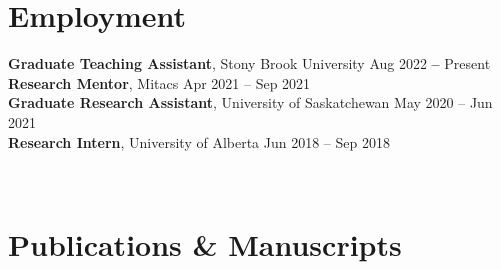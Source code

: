 \documentclass[letterpaper,11pt]{article}
\newcommand{\resumeSubHeadingListStart}{\begin{itemize}[leftmargin=0.15in, label={}]}
\newcommand{\resumeSubHeadingListEnd}{\end{itemize}}
\begin{document}
\section{Employment}
  \resumeSubHeadingListStart
    \small{\item{
        \textbf{Graduate Teaching Assistant}, Stony Brook University \hfill Aug 2022 \textbf{--} Present \\ \vspace{1pt}
        \textbf{Research Mentor}, Mitacs \hfill Apr 2021 – Sep 2021 \\ \vspace{1pt}
        \textbf{Graduate Research Assistant}, University of Saskatchewan \hfill May 2020 – Jun 2021 \\ \vspace{1pt}
        \textbf{Research Intern}, University of Alberta \hfill Jun 2018 – Sep 2018}} \\ \vspace{-5pt}
  \resumeSubHeadingListEnd



\section{Publications \& Manuscripts}

\end{document}
